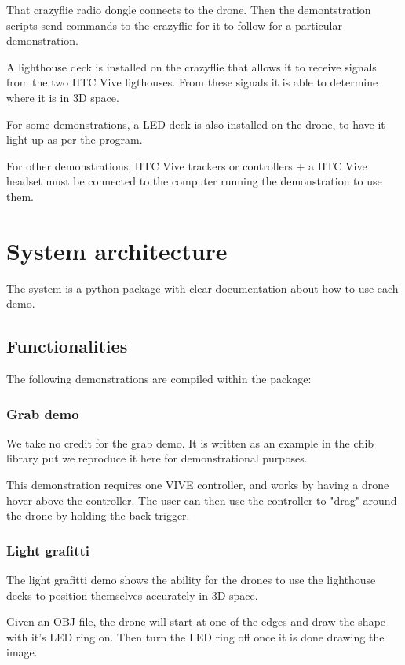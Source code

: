 \documentclass{article}
\begin{document}
  That crazyflie radio dongle connects to the drone. Then the demontstration
  scripts send commands to the crazyflie for it to follow for a particular
  demonstration.

  A lighthouse deck is installed on the crazyflie that allows it to receive
  signals from the two HTC Vive ligthouses. From these signals it is able
  to determine where it is in 3D space.

  For some demonstrations, a LED deck is also installed on the drone, to have
  it light up as per the program.

  For other demonstrations, HTC Vive trackers or controllers + a HTC Vive headset
  must be connected to the computer running the demonstration to use them.

  \section {System architecture}
  The system is a python package with clear documentation about how to use each
  demo. 

  \subsection {Functionalities}

  The following demonstrations are compiled within the package:

  \subsubsection{Grab demo}
  We take no credit for the grab demo. It is written as an example in the cflib
  library put we reproduce it here for demonstrational purposes.

  This demonstration requires one VIVE controller, and works by having a drone hover
  above the controller. The user can then use the controller to "drag" around the
  drone by holding the back trigger.

  \subsubsection{Light grafitti}
  The light grafitti demo shows the ability for the drones to use the lighthouse
  decks to position themselves accurately in 3D space.

  Given an OBJ file, the drone will start at one of the edges and draw the 
  shape with it's LED ring on. Then turn the LED ring off once it is done drawing
  the image.
  
\end{document}
